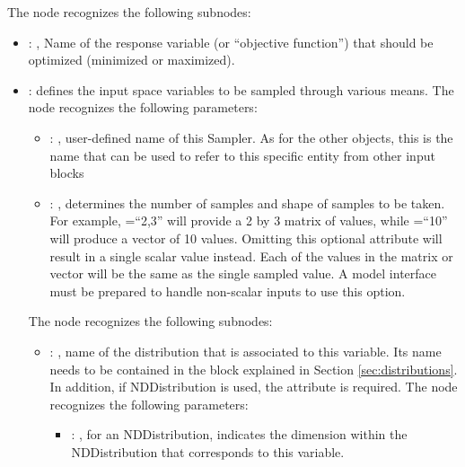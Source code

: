   The  node recognizes the following subnodes:
  \begin{itemize}
    \item {}: ,
      Name of the response variable (or ``objective function'') that should be optimized
      (minimized or maximized).

    \item {}:
      defines the input space variables to be sampled through various means.
      The  node recognizes the following parameters:
        \begin{itemize}
          \item {}: ,
            user-defined name of this Sampler. \nb As for the other objects,               this is
            the name that can be used to refer to this specific entity from other input blocks
          \item {}: ,
            determines the number of samples and shape of samples               to be taken.  For
            example, =``2,3'' will provide a 2 by 3               matrix of values,
            while =``10'' will produce a vector of 10 values.               Omitting
            this optional attribute will result in a single scalar value instead.               Each
            of the values in the matrix or vector will be the same as the single sampled value.
            \nb A model interface must be prepared to handle non-scalar inputs to use this option.
      \end{itemize}

      The  node recognizes the following subnodes:
      \begin{itemize}
        \item {}: ,
          name of the distribution that is associated to this variable.               Its name needs
          to be contained in the  block explained               in Section
          \ref{sec:distributions}. In addition, if NDDistribution is used,               the
          attribute  is required. 
          The  node recognizes the following parameters:
            \begin{itemize}
              \item {}: ,
                for an NDDistribution, indicates the dimension within the NDDistribution that
                corresponds               to this variable.
          \end{itemize}


\end{itemize}
\end{itemize}
